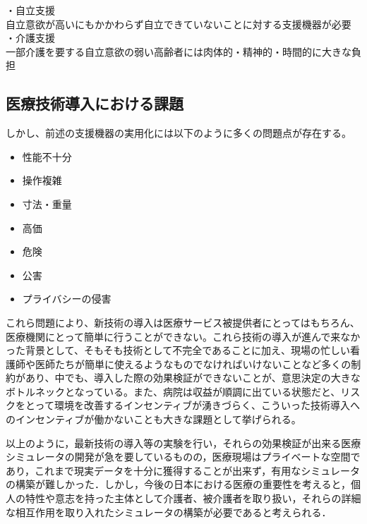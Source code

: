 ・自立支援 \\
自立意欲が高いにもかかわらず自立できていないことに対する支援機器が必要 \\
・介護支援 \\
一部介護を要する自立意欲の弱い高齢者には肉体的・精神的・時間的に大きな負担 \\



\subsection{医療技術導入における課題}

しかし、前述の支援機器の実用化には以下のように多くの問題点が存在する。

\begin{itemize}
 \item 性能不十分
 \item 操作複雑
 \item 寸法・重量
 \item 高価
 \item 危険
 \item 公害
 \item プライバシーの侵害
\end{itemize}

これら問題により、新技術の導入は医療サービス被提供者にとってはもちろん、医療機関にとって簡単に行うことができない。これら技術の導入が進んで来なかった背景として、そもそも技術として不完全であることに加え、現場の忙しい看護師や医師たちが簡単に使えるようなものでなければいけないことなど多くの制約があり、中でも、導入した際の効果検証ができないことが、意思決定の大きなボトルネックとなっている。また、病院は収益が順調に出ている状態だと、リスクをとって環境を改善するインセンティブが湧きづらく、こういった技術導入へのインセンティブが働かないことも大きな課題として挙げられる。

以上のように，最新技術の導入等の実験を行い，それらの効果検証が出来る医療シミュレータの開発が急を要しているものの，医療現場はプライベートな空間であり，これまで現実データを十分に獲得することが出来ず，有用なシミュレータの構築が難しかった．しかし，今後の日本における医療の重要性を考えると，個人の特性や意志を持った主体として介護者、被介護者を取り扱い，それらの詳細な相互作用を取り入れたシミュレータの構築が必要であると考えられる．

